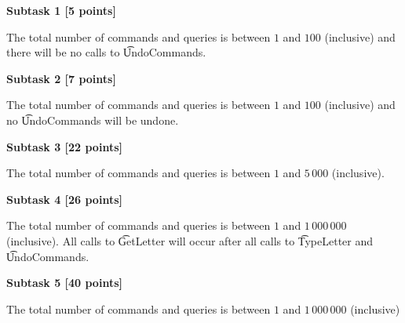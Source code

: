 \bf{Subtask 1 [5 points]}

The total number of commands and queries is between $1$ and $100$ (inclusive) and there will be no calls to \t{UndoCommands}.

\bf{Subtask 2 [7 points]}

The total number of commands and queries is between $1$ and $100$ (inclusive) and no \t{UndoCommands} will be undone.

\bf{Subtask 3 [22 points]}

The total number of commands and queries is between $1$ and $5\,000$ (inclusive).

\bf{Subtask 4 [26 points]}

The total number of commands and queries is between $1$ and $1\,000\,000$ (inclusive). All calls to \t{GetLetter} will occur after all calls to \t{TypeLetter} and \t{UndoCommands}.

\bf{Subtask 5 [40 points]}

The total number of commands and queries is between $1$ and $1\,000\,000$ (inclusive)